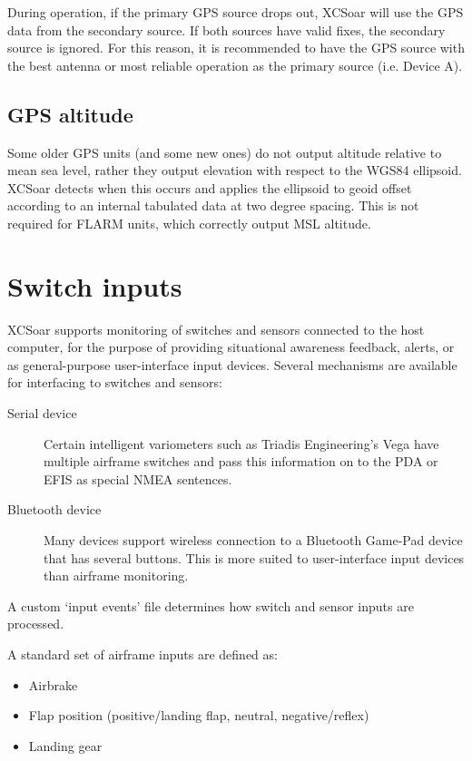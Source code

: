 During operation, if the primary GPS source drops out, XCSoar will use the GPS 
data from the secondary source.  If both sources have valid fixes, the secondary 
source is ignored.  For this reason, it is recommended to have the GPS source 
with the best antenna or most reliable operation as the primary source (i.e. Device A).

\subsection*{GPS altitude}

Some older GPS units (and some new ones) do not output altitude
relative to mean sea level, rather they output elevation with respect
to the WGS84 ellipsoid.  XCSoar detects when this occurs and applies
the ellipsoid to geoid offset according to an internal tabulated data
at two degree spacing.  This is not required for FLARM units,
which correctly output MSL altitude.

\section{Switch inputs}

XCSoar supports monitoring of switches and sensors connected to the
host computer, for the purpose of providing situational awareness
feedback, alerts, or as general-purpose user-interface input devices.
Several mechanisms are available for interfacing to switches and
sensors:
\begin{description}
\item[Serial device]  Certain intelligent variometers such as
 Triadis Engineering's Vega have multiple airframe switches
 and pass this information on to the PDA or EFIS as special
 NMEA sentences.
\item[Bluetooth device]  Many devices support wireless
 connection to a Bluetooth Game-Pad device that has several buttons.
 This is more suited to user-interface input devices than airframe
 monitoring.
\end{description}

A custom `input events' file determines how switch and sensor
inputs are processed.

A standard set of airframe inputs are defined as:
\begin{itemize}
\item Airbrake
\item Flap position (positive/landing flap, neutral, negative/reflex)
\item Landing gear
\end{itemize}


